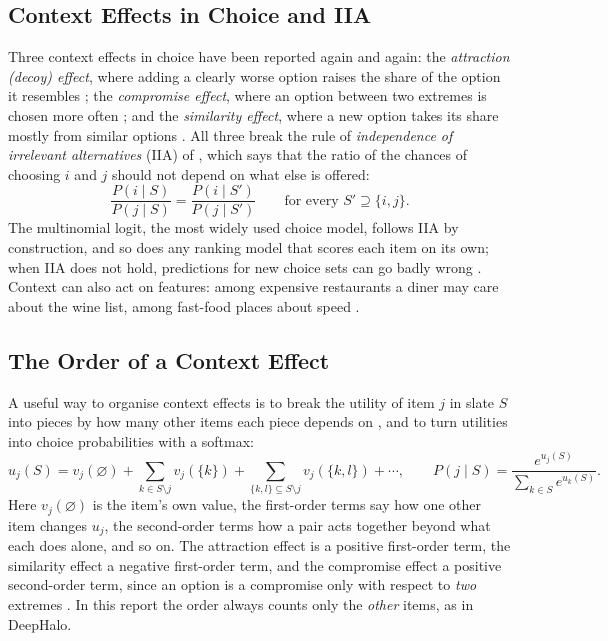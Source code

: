 \documentclass[11pt,a4paper]{article}
\numberwithin{table}{section}
\numberwithin{figure}{section}
\numberwithin{equation}{section}
\begin{document}
\subsection{Context Effects in Choice and IIA}
Three context effects in choice have been reported again and again: the \emph{attraction (decoy) effect}, where adding a clearly worse option raises the share of the option it resembles \citep{huber1982}; the \emph{compromise effect}, where an option between two extremes is chosen more often \citep{simonson1989}; and the \emph{similarity effect}, where a new option takes its share mostly from similar options \citep{tversky1972}. All three break the rule of \emph{independence of irrelevant alternatives} (IIA) of \citet{luce1959}, which says that the ratio of the chances of choosing $i$ and $j$ should not depend on what else is offered:
\begin{equation}
\frac{P(i\mid S)}{P(j\mid S)}=\frac{P(i\mid S')}{P(j\mid S')}\qquad\text{for every } S'\supseteq\{i,j\}.
\end{equation}
The multinomial logit, the most widely used choice model, follows IIA by construction, and so does any ranking model that scores each item on its own; when IIA does not hold, predictions for new choice sets can go badly wrong \citep{seshadri2019}. Context can also act on features: among expensive restaurants a diner may care about the wine list, among fast-food places about speed \citep{tomlinson2021}.

\subsection{The Order of a Context Effect}\label{sec:order}
A useful way to organise context effects is to break the utility of item $j$ in slate $S$ into pieces by how many other items each piece depends on \citep{batsell1985,seshadri2019,zhang2025}, and to turn utilities into choice probabilities with a softmax:
\begin{equation}
u_j(S)=v_j(\varnothing)+\sum_{k\in S\setminus j}v_j(\{k\})+\sum_{\{k,l\}\subseteq S\setminus j}v_j(\{k,l\})+\cdots,\qquad
P(j\mid S)=\frac{e^{u_j(S)}}{\sum_{k\in S}e^{u_k(S)}}.
\end{equation}
Here $v_j(\varnothing)$ is the item's own value, the first-order terms say how one other item changes $u_j$, the second-order terms how a pair acts together beyond what each does alone, and so on. The attraction effect is a positive first-order term, the similarity effect a negative first-order term, and the compromise effect a positive second-order term, since an option is a compromise only with respect to \emph{two} extremes \citep{zhang2025}. In this report the order always counts only the \emph{other} items, as in DeepHalo.
\end{document}
